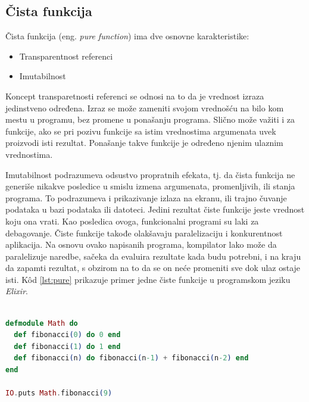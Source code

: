 \documentclass[12pt,oneside]{memoir}
\begin{document}
\subsection{Čista funkcija}
\par  Čista funkcija (eng. \textit{pure function}) ima dve osnovne karakteristike: 
\begin{itemize}
\item Transparentnost referenci 
\item Imutabilnost 
\end{itemize}
\par  Koncept transparetnosti referenci se odnosi na to da je vrednost izraza jedinstveno određena. Izraz se može zameniti svojom vrednošću na bilo kom mestu u programu, bez promene u ponašanju programa. Slično može važiti i za funkcije, ako se pri pozivu funkcije sa istim vrednostima argumenata uvek proizvodi isti rezultat. Ponašanje takve funkcije je određeno njenim ulaznim vrednostima.

\par Imutabilnost podrazumeva odsustvo propratnih efekata, tj. da čista funkcija ne generiše nikakve posledice u smislu izmena argumenata, promenljivih, ili stanja programa. To podrazumeva i prikazivanje izlaza na ekranu, ili trajno čuvanje podataka u bazi podataka ili datoteci. Jedini rezultat čiste funkcije jeste vrednost koju ona vrati. Kao posledica ovoga, funkcionalni programi su laki za debagovanje. Čiste funkcije takođe olakšavaju paralelizaciju i konkurentnost aplikacija. Na osnovu ovako napisanih programa, kompilator lako može da paralelizuje naredbe, sačeka da evaluira rezultate kada budu potrebni, i na kraju da zapamti rezultat, s obzirom na to da se on neće promeniti sve dok ulaz ostaje isti. K\^{o}d \ref{lst:pure} prikazuje primer jedne čiste funkcije u programskom jeziku \emph{Elixir}. \\

\begin{minipage}{\linewidth}
\begin{lstlisting}[language=elixir, basicstyle=\small, caption={Primer čiste funkcije},captionpos=b, label={lst:pure}]

defmodule Math do 
  def fibonacci(0) do 0 end
  def fibonacci(1) do 1 end
  def fibonacci(n) do fibonacci(n-1) + fibonacci(n-2) end
end

IO.puts Math.fibonacci(9)
\end{lstlisting}
\end{minipage}
\end{document}

